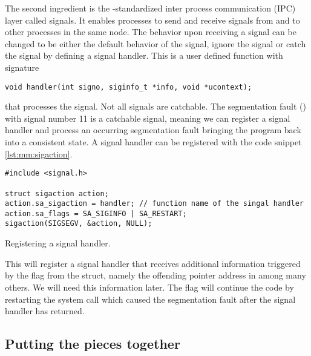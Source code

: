 The second ingredient is the \posix-standardized inter process communication (IPC) layer called signals.
It enables processes to send and receive signals from and to other processes in the same node.
The behavior upon receiving a signal can be changed to be either the default behavior of the signal, ignore the signal or catch the signal by defining a signal handler.
This is a user defined function with signature
\begin{verbatim}
void handler(int signo, siginfo_t *info, void *ucontext);
\end{verbatim}
that processes the signal.
Not all signals are catchable.
The segmentation fault () with signal number \num{11} is a catchable signal, meaning we can register a signal handler and process an occurring segmentation fault bringing the program back into a consistent state.
A signal handler can be registered with the code snippet \cref{lst:mm:sigaction}.
\begin{codelisting}
\begin{verbatim}
#include <signal.h>

struct sigaction action;
action.sa_sigaction = handler; // function name of the singal handler
action.sa_flags = SA_SIGINFO | SA_RESTART;
sigaction(SIGSEGV, &action, NULL);
\end{verbatim}
\caption{Registering a signal handler.}
\label{lst:mm:sigaction}
\end{codelisting}
This will register a signal handler that receives additional information triggered by the  flag from the  struct, namely the offending pointer address in  among many others.
We will need this information later.
The flag  will continue the code by restarting the system call which caused the segmentation fault after the signal handler has returned.

\subsection{Putting the pieces together}

